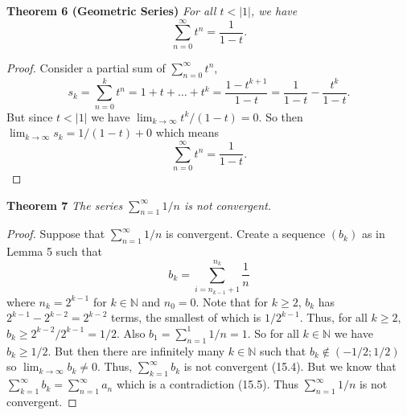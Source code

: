 \documentclass{article}
\begin{document}
\begin{flushleft}
\textbf{Theorem 6 (Geometric Series)}
\textsl{For all $t < |1|$, we have
\[
\sum_{n=0}^{\infty} t^n = \frac{1}{1-t}.
\]}
\begin{proof}
Consider a partial sum of $\sum_{n=0}^{\infty} t^n$,
\[
s_k = \sum_{n=0}^{k} t^n= 1+t+\dots+t^k = \frac{1-t^{k+1}}{1-t} = \frac{1}{1-t} - \frac{t^k}{1-t}.
\]
But since $t < |1|$ we have $\lim_{k \rightarrow \infty} t^k/(1-t) = 0$. So then $\lim_{k \rightarrow \infty} s_k = 1/(1-t) + 0$ which means
\[
\sum_{n=0}^{\infty} t^n = \frac{1}{1-t}.
\]
\end{proof}

\textbf{Theorem 7}
\textsl{The series $\sum_{n=1}^{\infty} 1/n$ is not convergent.}
\begin{proof}
Suppose that $\sum_{n=1}^{\infty} 1/n$ is convergent. Create a sequence $(b_k)$ as in Lemma 5 such that
\[
b_k = \sum_{i = n_{k-1} + 1}^{n_k} \frac{1}{n}
\]
where $n_k = 2^{k-1}$ for $k \in \mathbb{N}$ and $n_0 = 0$. Note that for $k \geq 2$, $b_k$ has $2^{k-1} - 2^{k-2} = 2^{k-2}$ terms, the smallest of which is $1/2^{k-1}$. Thus, for all $k \geq 2$, $b_k \geq 2^{k-2}/2^{k-1} = 1/2$. Also $b_1 = \sum_{n=1}^{1} 1/n = 1$. So for all $k \in \mathbb{N}$ we have $b_k \geq 1/2$. But then there are infinitely many $k \in \mathbb{N}$ such that $b_k \notin (-1/2 ; 1/2)$ so $\lim_{k \rightarrow \infty} b_k \neq 0$. Thus, $\sum_{k=1}^{\infty} b_k$ is not convergent (15.4). But we know that $\sum_{k=1}^{\infty} b_k = \sum_{n=1}^{\infty} a_n$ which is a contradiction (15.5). Thus $\sum_{n=1}^{\infty} 1/n$ is not convergent.
\end{proof}


\end{flushleft}
\end{document}
